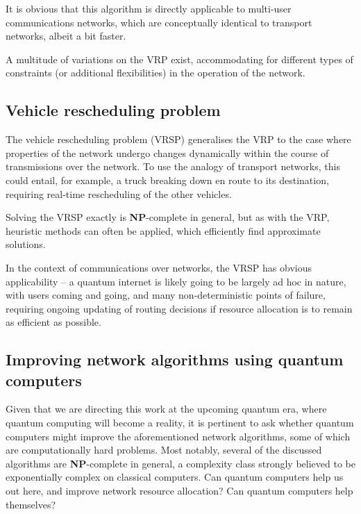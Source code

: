 \documentclass[aps, rmp, twocolumn, amsmath, amssymb, nofootinbib, superscriptaddress, longbibliography, floatfix, table-of-contents, eqsecnum]{revtex4-1}
\begin{document}
It is obvious that this algorithm is directly applicable to multi-user communications networks, which are conceptually identical to transport networks, albeit a bit faster. 

A multitude of variations on the VRP exist, accommodating for different types of constraints (or additional flexibilities) in the operation of the network.

%
%

\subsection{Vehicle rescheduling problem} \label{sec:VRSP} 

The vehicle rescheduling problem (VRSP) generalises the VRP to the case where properties of the network undergo changes dynamically within the course of transmissions over the network. To use the analogy of transport networks, this could entail, for example, a truck breaking down en route to its destination, requiring real-time rescheduling of the other vehicles.

Solving the VRSP exactly is \textbf{NP}-complete in general, but as with the VRP, heuristic methods can often be applied, which efficiently find approximate solutions.

In the context of communications over networks, the VRSP has obvious applicability -- a quantum internet is likely going to be largely ad hoc in nature, with users coming and going, and many non-deterministic points of failure, requiring ongoing updating of routing decisions if resource allocation is to remain as efficient as possible.

%
%

\subsection{Improving network algorithms using quantum computers} 

Given that we are directing this work at the upcoming quantum era, where quantum computing will become a reality, it is pertinent to ask whether quantum computers might improve the aforementioned network algorithms, some of which are computationally hard problems. Most notably, several of the discussed algorithms are \textbf{NP}-complete in general, a complexity class strongly believed to be exponentially complex on classical computers. Can quantum computers help us out here, and improve network resource allocation? Can quantum computers help themselves?
\end{document}
